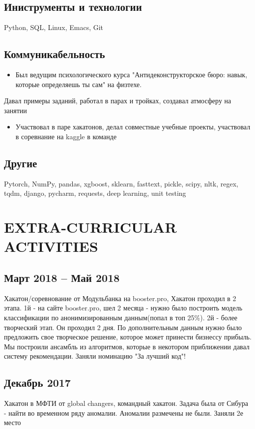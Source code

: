 \documentclass[11pt]{article}
\begin{document}
\subsection{Иниструменты и технологии}
\label{sec:orge3bf59a}
Python, SQL, Linux, Emacs, Git
\subsection{Коммуникабельность}
\label{sec:org6ebf45f}
\begin{itemize}
\item Был ведущим психологического курса "Антидеконструкторское бюро: навык, которые определяешь ты сам" на физтехе.
\end{itemize}
Давал примеры заданий, работал в парах и тройках, создавал атмосферу на занятии
\begin{itemize}
\item Участвовал в паре хакатонов, делал совместные учебные проекты, участвовал в соревнание на kaggle в команде
\end{itemize}
\subsection{Другие}
\label{sec:orgfe6cae8}
Pytorch, NumPy, pandas, xgboost, sklearn, fasttext, pickle, scipy, nltk, regex, tqdm, django, pycharm, requests, deep learning, unit testing

\section{EXTRA-CURRICULAR ACTIVITIES}
\label{sec:orgc8bc05a}
\subsection{Март 2018 – Май 2018}
\label{sec:orgd3b24ba}
Хакатон/соревнование от Модульбанка на booster.pro, Хакатон проходил в 2 этапа. 1й - на сайте booster.pro,
шел 2 месяца - нужно было построить модель классификации по анонимизированным данным(попал в топ 25\%). 2й - более творческий 
этап. Он проходил 2 дня. По дополнительным данным нужно было предложить свое творческое решение, которое может принести бизнессу
прибыль. Мы построили ансамбль из алгоритмов, которые в некотором приближении давал систему рекомендации. Заняли номинацию "За лучший код"!

\subsection{Декабрь 2017}
\label{sec:orgd626151}
Хакатон в МФТИ от global changers, командный хакатон. Задача была от Сибура - найти во временном ряду аномалии. 
Аномалии размечены не были. Заняли 2е место
\end{document}
